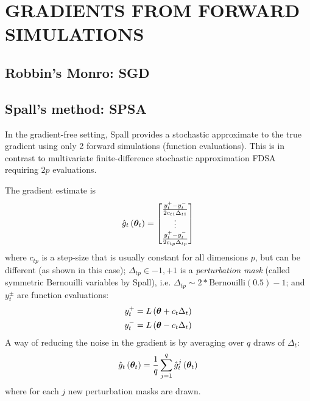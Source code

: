 \documentclass[]{article}
\begin{document}
\section{GRADIENTS FROM FORWARD SIMULATIONS} \label{gradsforward}

\subsection{Robbin's Monro: SGD}


\newcommand{\gradestimate}[2]{\hat{g}_{#1}\lp#2\rp}
\newcommand{\gradestimaterepeat}[3]{\hat{g}^{#3}_{#1}\lp#2\rp}
\newcommand{\feval}[2]{y_{#1}^{#2}}
\newcommand{\cstep}[2]{c_{#1#2}}
\newcommand{\cstepconst}[1]{c_{#1}}
\newcommand{\dstep}[2]{\Delta_{#1#2}}
\newcommand{\dstepconst}[1]{\Delta_{#1}}
\newcommand{\loglik}[1]{L\lp#1\rp}

\subsection{Spall's method: SPSA}
In the gradient-free setting, Spall \cite{spall_spsa} provides a stochastic approximate to the true gradient using only 2 forward simulations (function evaluations).  This is in contrast to multivariate finite-difference stochastic approximation FDSA \cite{kiefer1952} requiring $2p$ evaluations.  

The gradient estimate is
\begin{equation}
  \gradestimate{t}{\thetav_t} = \begin{bmatrix} 
                                   \frac{\feval{t}{+} - \feval{t}{-}}{2 \cstep{t}{1} \dstep{t}{1}} \\
                                   \vdots \\
                                   \frac{\feval{t}{+} - \feval{t}{-}}{2 \cstep{t}{p} \dstep{t}{p}} \\
                                \end{bmatrix}
\end{equation}
where $\cstep{t}{p}$ is a step-size that is usually constant for all dimensions $p$, but can be different (as shown in this case); $\dstep{t}{p} \in {-1, +1}$ is a {\em perturbation mask} (called symmetric Bernouilli variables by Spall), i.e. $\dstep{t}{p} \sim 2*\text{Bernouilli}(0.5) - 1$; and  $\feval{t}{\pm}$ are function evaluations:
\begin{eqnarray}
  \feval{t}{+} &= \loglik{\thetav + \cstepconst{t}\dstepconst{t}} \\
  \feval{t}{-} &= \loglik{\thetav - \cstepconst{t}\dstepconst{t}}
\end{eqnarray}
A way of reducing the noise in the gradient is by averaging over $q$ draws of $\dstepconst{t}$:
\begin{equation}
  \gradestimate{t}{\thetav_t} = \frac{1}{q} \sum_{j=1}^q \gradestimaterepeat{t}{\thetav_t}{j}
\end{equation}
where for each $j$ new perturbation masks are drawn.  
\end{document}
